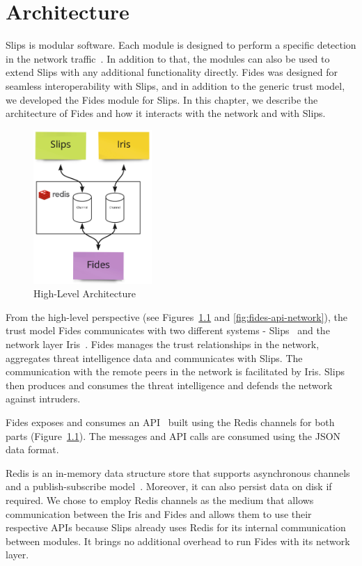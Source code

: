 \chapter{Architecture}
\label{ch:architecture}
Slips is modular software. Each module is designed to perform a specific detection in the network traffic~\cite{slips}.
In addition to that, the modules can also be used to extend Slips with any additional functionality directly. 
Fides was designed for seamless interoperability with Slips, and in addition to the generic trust model, we developed the Fides module for Slips.
In this chapter, we describe the architecture of Fides and how it interacts with the network and with Slips.

\begin{figure}[ht]
    \centering
    \includegraphics[width=0.4\textwidth]{assets/redis_channels.jpeg}
    \caption{High-Level Architecture}
    \label{fig:high-level-architecture}
\end{figure}

From the high-level perspective (see Figures~\ref{fig:high-level-architecture} and \ref{fig:fides-api-network}), the trust model Fides  communicates with two different systems - Slips~\cite{slips} and the network layer Iris~\cite{nl}.
Fides manages the trust relationships in the network, aggregates threat intelligence data and communicates with Slips. The communication with the remote peers in the network is facilitated by Iris. 
Slips then produces and consumes the threat intelligence and defends the network against intruders.

Fides exposes and consumes an API~\cite{api} built using the Redis channels for both parts (Figure~\ref{fig:high-level-architecture}).
The messages and API calls are consumed using the JSON~\cite{json} data format.

Redis is an in-memory data structure store that supports asynchronous channels and a publish-subscribe model~\cite{redis}. Moreover, it can also persist data on disk if required.
We chose to employ Redis channels as the medium that allows communication between the Iris and Fides and allows them to use their respective APIs because Slips already uses Redis for its internal communication between modules. It brings no additional overhead to run Fides with its network layer.



